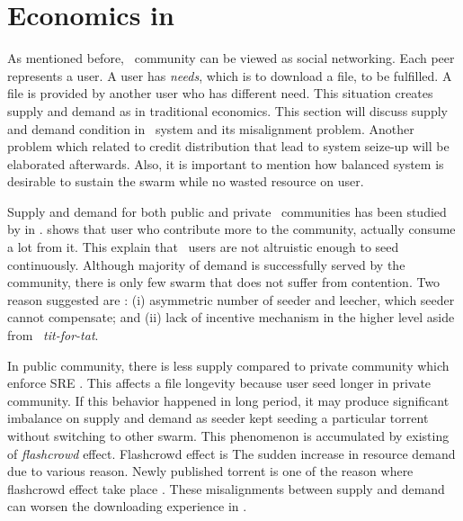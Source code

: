 \section{Economics in \bt}
As mentioned before, \bt~community can be viewed as social networking. Each peer represents a user. A user has \textit{needs}, which is to download a file, to be fulfilled. A file is provided by another user who has different need. This situation creates supply and demand as in traditional economics. This section will discuss supply and demand condition in \bt~system and its misalignment problem. Another problem which related to credit distribution that lead to system seize-up will be elaborated afterwards. Also, it is important to mention how balanced system is desirable to sustain the swarm while no wasted resource on user.

Supply and demand for both public and private \bt~communities has been studied by \citeauthor{2009:demandsupplyres:andrade} in \citeyear{2009:demandsupplyres:andrade}. \citeauthor{2009:demandsupplyres:andrade} shows that user who contribute more to the community, actually consume a lot from it. This explain that \bt~users are not altruistic enough to seed continuously. Although majority of demand is successfully served by the community, there is only few swarm that does not suffer from contention. Two reason \citeauthor{2009:demandsupplyres:andrade} suggested are : (i) asymmetric number of seeder and leecher, which seeder cannot compensate; and (ii) lack of incentive mechanism in the higher level aside from \bt~\textit{tit-for-tat}. 

In public community, there is less supply compared to private community which enforce SRE \cite{2009:demandsupplyres:andrade}. This affects a file longevity because user seed longer in private community. If this behavior happened  in long period, it may produce significant imbalance on supply and demand as seeder kept seeding a particular torrent without switching to other swarm. This phenomenon is accumulated by existing of \textit{flashcrowd} effect. Flashcrowd effect is The sudden increase in resource demand due to various reason. Newly published torrent is one of the reason where flashcrowd effect take place \cite{2013:swarmevolution:su}. These misalignments between supply and demand can worsen the downloading experience in \bt.

